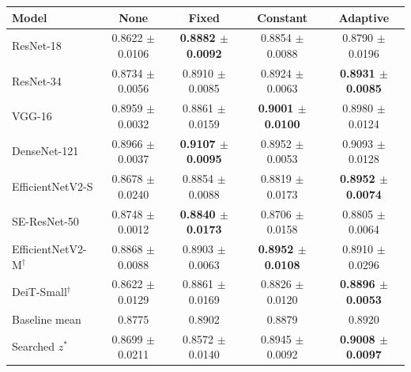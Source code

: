\begin{tabular}{@{}lcccc@{}}
\toprule
Model & None & Fixed & Constant & Adaptive \\
\midrule
ResNet-18 & 0.8622 $\pm$ 0.0106 & \textbf{0.8882 $\pm$ 0.0092} & 0.8854 $\pm$ 0.0088 & 0.8790 $\pm$ 0.0196 \\
ResNet-34 & 0.8734 $\pm$ 0.0056 & 0.8910 $\pm$ 0.0085 & 0.8924 $\pm$ 0.0063 & \textbf{0.8931 $\pm$ 0.0085} \\
VGG-16 & 0.8959 $\pm$ 0.0032 & 0.8861 $\pm$ 0.0159 & \textbf{0.9001 $\pm$ 0.0100} & 0.8980 $\pm$ 0.0124 \\
DenseNet-121 & 0.8966 $\pm$ 0.0037 & \textbf{0.9107 $\pm$ 0.0095} & 0.8952 $\pm$ 0.0053 & 0.9093 $\pm$ 0.0128 \\
EfficientNetV2-S & 0.8678 $\pm$ 0.0240 & 0.8854 $\pm$ 0.0088 & 0.8819 $\pm$ 0.0173 & \textbf{0.8952 $\pm$ 0.0074} \\
SE-ResNet-50 & 0.8748 $\pm$ 0.0012 & \textbf{0.8840 $\pm$ 0.0173} & 0.8706 $\pm$ 0.0158 & 0.8805 $\pm$ 0.0064 \\
EfficientNetV2-M$^{\dagger}$ & 0.8868 $\pm$ 0.0088 & 0.8903 $\pm$ 0.0063 & \textbf{0.8952 $\pm$ 0.0108} & 0.8910 $\pm$ 0.0296 \\
DeiT-Small$^{\dagger}$ & 0.8622 $\pm$ 0.0129 & 0.8861 $\pm$ 0.0169 & 0.8826 $\pm$ 0.0120 & \textbf{0.8896 $\pm$ 0.0053} \\
\midrule
Baseline mean & 0.8775 & 0.8902 & 0.8879 & 0.8920 \\
\midrule
Searched $z^{*}$ & 0.8699 $\pm$ 0.0211 & 0.8572 $\pm$ 0.0140 & 0.8945 $\pm$ 0.0092 & \textbf{0.9008 $\pm$ 0.0097} \\
\bottomrule
\end{tabular}
